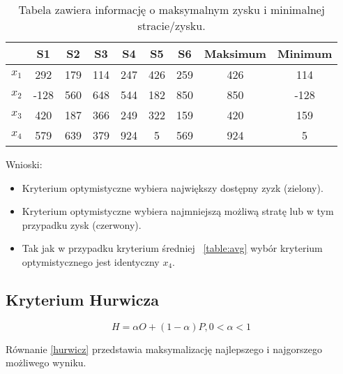 \documentclass{article}
\begin{document}
\begin{table}[H]
  \begin{center}
    \begin{tabular}{ c |  c  c   c   c   c   c  | c | c  }
      & S1 & S2 & S3 & S4 & S5 & S6 & Maksimum & Minimum \\
      \hline
      $x_1$ & 292 & 179 & 114 & 247 & 426 & 259 & 426 & 114 \\
      $x_2$ & -128 & 560 & 648 & 544 & 182 & 850 & 850 & -128 \\
      $x_3$ & 420 & 187 & 366 & 249 & 322 & 159 & 420 & \cellcolor{red!25} 159 \\
      $x_4$ & 579 & 639 & 379 & 924 & 5 & 569 & \cellcolor{green!25} 924 & 5 \\
      \hline
    \end{tabular} 
    \caption{\label{table:optpes}Tabela zawiera informację o maksymalnym zysku i minimalnej stracie/zysku.}
  \end{center}
\end{table}

Wnioski:

\begin{itemize}
  \item Kryterium optymistyczne wybiera największy dostępny zyzk (zielony).
  \item Kryterium optymistyczne wybiera najmniejszą możliwą stratę lub w tym przypadku zysk (czerwony).
  \item Tak jak w przypadku kryterium średniej ~\ref{table:avg} wybór kryterium optymistycznego jest identyczny $x_4$.
\end{itemize}

\subsection{Kryterium Hurwicza}

\begin{equation}\label{hurwicz}
  H = \alpha O + (1 - \alpha) P, 0 \lt \alpha \lt 1
\end{equation}

Równanie \ref{hurwicz} przedstawia maksymalizację najlepszego i najgorszego możliwego wyniku.
\end{document}
